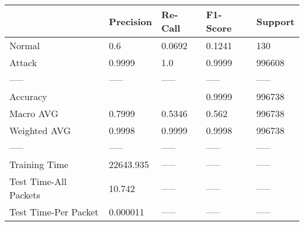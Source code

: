 \begin{tabular}{lllll}
\toprule
{} &  Precision & Re-Call & F1-Score & Support \\
\midrule
Normal                &        0.6 &  0.0692 &   0.1241 &     130 \\
Attack                &     0.9999 &     1.0 &   0.9999 &  996608 \\
-----                 &      ----- &   ----- &    ----- &   ----- \\
Accuracy              &            &         &   0.9999 &  996738 \\
Macro AVG             &     0.7999 &  0.5346 &    0.562 &  996738 \\
Weighted AVG          &     0.9998 &  0.9999 &   0.9998 &  996738 \\
-----                 &      ----- &   ----- &    ----- &   ----- \\
Training Time         &  22643.935 &   ----- &    ----- &   ----- \\
Test Time-All Packets &     10.742 &   ----- &    ----- &   ----- \\
Test Time-Per Packet  &   0.000011 &   ----- &    ----- &   ----- \\
\bottomrule
\end{tabular}
